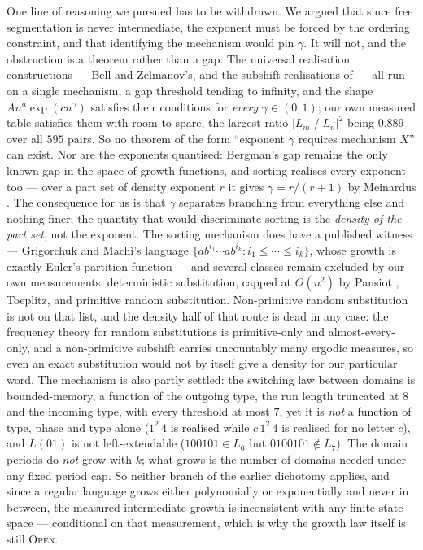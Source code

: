 \documentclass[11pt]{article}
\theoremstyle{definition}
\theoremstyle{remark}
\newcommand{\OPEN}{\textsc{Open}}
\begin{document}
One line of reasoning we pursued has to be withdrawn. We argued that since free segmentation is never
intermediate, the exponent must be forced by the ordering constraint, and that identifying the
mechanism would pin $\gamma$. It will not, and the obstruction is a theorem rather than a gap. The
universal realisation constructions --- Bell and Zelmanov's, and the subshift realisations of
\cite{GMZ} --- all run on a single mechanism, a gap threshold tending to infinity, and the shape
$An^{a}\exp(cn^{\gamma})$ satisfies their conditions for \emph{every} $\gamma\in(0,1)$; our own measured
table satisfies them with room to spare, the largest ratio $|L_m|/|L_n|^2$ being $0.889$ over all $595$
pairs. So no theorem of the form ``exponent $\gamma$ requires mechanism $X$'' can exist. Nor are the
exponents quantised: Bergman's gap remains the only known gap in the space of growth functions, and
sorting realises every exponent too --- over a part set of density exponent $r$ it gives
$\gamma=r/(r+1)$ by Meinardus \cite{Meinardus}. The consequence for us is that $\gamma$ separates branching from
everything else and nothing finer; the quantity that would discriminate sorting is the \emph{density of
the part set}, not the exponent. The sorting mechanism does have a published witness --- Grigorchuk and
Mach\`i's \cite{GMachi} language $\{ab^{i_1}\cdots ab^{i_k}:i_1\le\cdots\le i_k\}$, whose growth is
exactly Euler's partition function --- and several classes remain excluded by our own measurements:
deterministic substitution, capped at $\Theta(n^2)$ by Pansiot \cite{Pansiot}, Toeplitz, and primitive
random substitution. Non-primitive random substitution is not on that list, and the density half of that route is dead in any case:
the frequency theory for random substitutions is primitive-only and almost-every-only, and a
non-primitive subshift carries uncountably many ergodic measures, so even an exact substitution would
not by itself give a density for our particular word. The mechanism is also partly settled: the switching law between domains is bounded-memory, a function of the outgoing type, the run length truncated at $8$ and the incoming type, with every threshold at most $7$, yet it is \emph{not} a function of type, phase and type alone ($1^2\,4$ is realised while $c\,1^2\,4$ is realised for no letter $c$), and $L(01)$ is not left-extendable ($100101\in L_6$ but $0100101\notin L_7$). The domain periods do \emph{not} grow with $k$; what grows is the number of domains needed under any fixed period cap. So neither branch of the earlier dichotomy applies, and since a regular language grows either polynomially or exponentially and never in between, the measured intermediate growth is inconsistent with any finite state space --- conditional on that measurement, which is why the growth law itself is still \OPEN.
\end{document}
